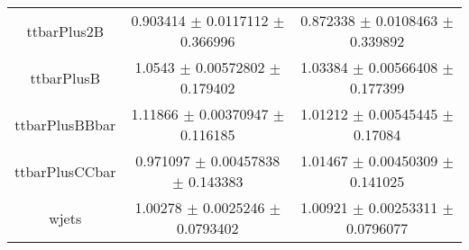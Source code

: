 \begin{table}
\begin{tabular}{ccc}
ttbarPlus2B & \num{0.903414} $\pm$ \num{0.0117112} $\pm$ \num{0.366996} & \num{0.872338} $\pm$ \num{0.0108463} $\pm$ \num{0.339892}\\
ttbarPlusB & \num{1.0543} $\pm$ \num{0.00572802} $\pm$ \num{0.179402} & \num{1.03384} $\pm$ \num{0.00566408} $\pm$ \num{0.177399}\\
ttbarPlusBBbar & \num{1.11866} $\pm$ \num{0.00370947} $\pm$ \num{0.116185} & \num{1.01212} $\pm$ \num{0.00545445} $\pm$ \num{0.17084}\\
ttbarPlusCCbar & \num{0.971097} $\pm$ \num{0.00457838} $\pm$ \num{0.143383} & \num{1.01467} $\pm$ \num{0.00450309} $\pm$ \num{0.141025}\\
wjets & \num{1.00278} $\pm$ \num{0.0025246} $\pm$ \num{0.0793402} & \num{1.00921} $\pm$ \num{0.00253311} $\pm$ \num{0.0796077}\\
\bottomrule
\end{tabular}
\end{table}